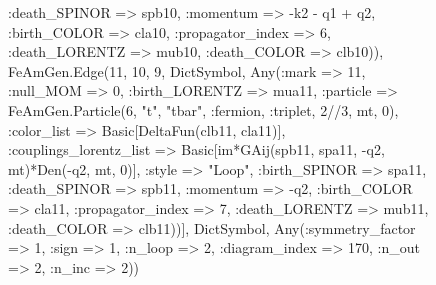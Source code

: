 \documentclass{revtex4}
\begin{document}
\begin{figure}[!htb]
\begin{center}
{:death_SPINOR => spb10, :momentum => -k2 - q1 + q2, :birth_COLOR => cla10, :propagator_index => 6, :death_LORENTZ => mub10, :death_COLOR => clb10)), FeAmGen.Edge(11, 10, 9, Dict{Symbol, Any}(:mark => 11, :null_MOM => 0, :birth_LORENTZ => mua11, :particle => FeAmGen.Particle(6, "t", "tbar", :fermion, :triplet, 2//3, mt, 0), :color_list => Basic[DeltaFun(clb11, cla11)], :couplings_lorentz_list => Basic[im*GAij(spb11, spa11, -q2, mt)*Den(-q2, mt, 0)], :style => "Loop", :birth_SPINOR => spa11, :death_SPINOR => spb11, :momentum => -q2, :birth_COLOR => cla11, :propagator_index => 7, :death_LORENTZ => mub11, :death_COLOR => clb11))], Dict{Symbol, Any}(:symmetry_factor => 1, :sign => 1, :n_loop => 2, :diagram_index => 170, :n_out => 2, :n_inc => 2)) 
}
\end{center}
\end{figure}
\end{document}
